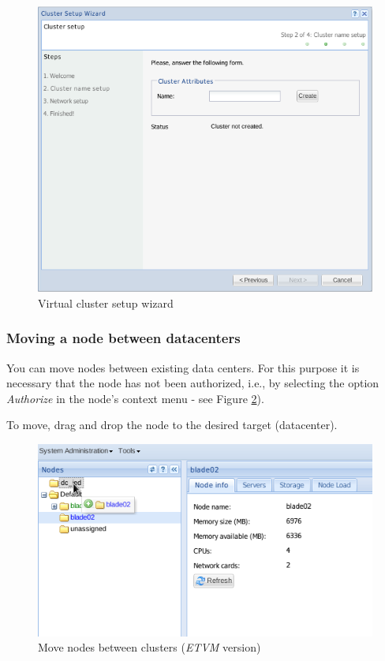 {\begin{figure}[H]
        \begin{center}
        \includegraphics[scale=0.6]{screenshots/cluster_config.png}
        \caption{Virtual cluster setup wizard}
        \label{fig:cluster_config}
        \end{center}
\end{figure}

\subsubsection{Moving a node between datacenters}
You can move nodes between existing data centers. For this purpose it is necessary that the node has not been authorized, i.e., by selecting the option \emph{Authorize} in the node's context menu - see Figure \ref{fig:cluster-move}).

To move, drag and drop the node to the desired target (datacenter).
\begin{figure}[H]
        \begin{center}
        \includegraphics[scale=0.6]{screenshots/cluster-move.png}
        \caption{Move nodes between clusters (\emph{ETVM} version)}
        \label{fig:cluster-move}
        \end{center}
\end{figure}

}
